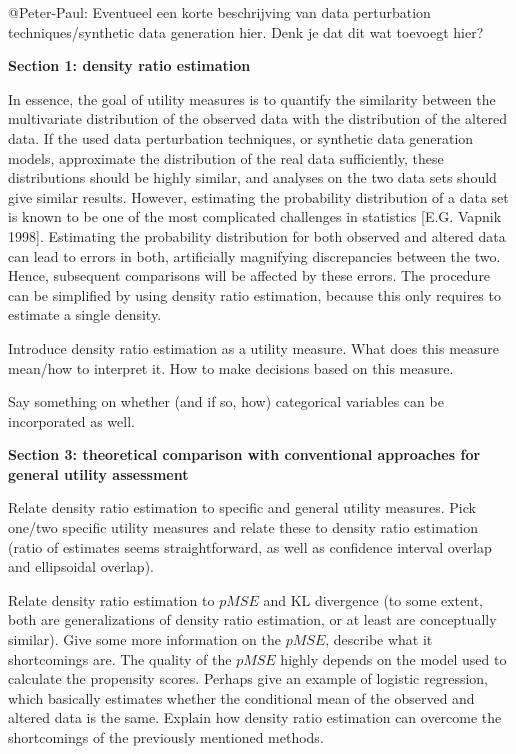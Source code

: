 \documentclass[
]{article}
\begin{document}
@Peter-Paul: Eventueel een korte beschrijving van data perturbation
techniques/synthetic data generation hier. Denk je dat dit wat toevoegt
hier?

\textbf{Section 1: density ratio estimation}

In essence, the goal of utility measures is to quantify the similarity
between the multivariate distribution of the observed data with the
distribution of the altered data. If the used data perturbation
techniques, or synthetic data generation models, approximate the
distribution of the real data sufficiently, these distributions should
be highly similar, and analyses on the two data sets should give similar
results. However, estimating the probability distribution of a data set
is known to be one of the most complicated challenges in statistics
{[}E.G. Vapnik 1998{]}. Estimating the probability distribution for both
observed and altered data can lead to errors in both, artificially
magnifying discrepancies between the two. Hence, subsequent comparisons
will be affected by these errors. The procedure can be simplified by
using density ratio estimation, because this only requires to estimate a
single density.

Introduce density ratio estimation as a utility measure. What does this
measure mean/how to interpret it. How to make decisions based on this
measure.

Say something on whether (and if so, how) categorical variables can be
incorporated as well.

\textbf{Section 3: theoretical comparison with conventional approaches
for general utility assessment}

Relate density ratio estimation to specific and general utility
measures. Pick one/two specific utility measures and relate these to
density ratio estimation (ratio of estimates seems straightforward, as
well as confidence interval overlap and ellipsoidal overlap).

Relate density ratio estimation to \(pMSE\) and KL divergence (to some
extent, both are generalizations of density ratio estimation, or at
least are conceptually similar). Give some more information on the
\(pMSE\), describe what it shortcomings are. The quality of the \(pMSE\)
highly depends on the model used to calculate the propensity scores.
Perhaps give an example of logistic regression, which basically
estimates whether the conditional mean of the observed and altered data
is the same. Explain how density ratio estimation can overcome the
shortcomings of the previously mentioned methods.
\end{document}
